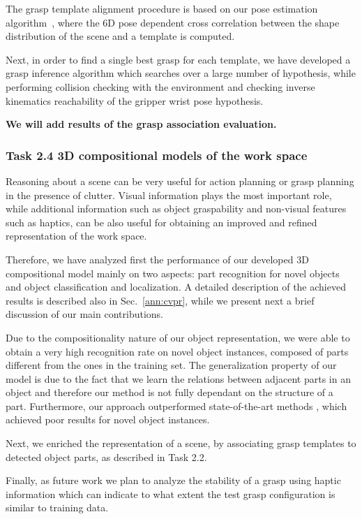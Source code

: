 \documentclass[a4paper,11pt,pdf]{pacmanreport}
\begin{document}
The grasp template alignment procedure is based on our pose estimation algorithm~\cite{detry2010ac}, where the 6D pose dependent cross correlation between the shape distribution of the scene and a template is computed. 

Next, in order to find a single best grasp for each template, we have developed a grasp inference algorithm which searches over a large number of hypothesis, while performing collision checking with the environment and checking inverse kinematics reachability of the gripper wrist pose hypothesis.

\textbf{We will add results of the grasp association evaluation.}

\subsubsection{Task 2.4 3D compositional models of the work space}

Reasoning about a scene can be very useful for action planning or grasp planning in the presence of clutter. Visual information plays the most important role, while additional information such as object graspability and non-visual features such as haptics, can be also useful for obtaining an improved and refined representation of the work space.

Therefore, we have analyzed first the performance of our developed 3D compositional model mainly on two aspects: part recognition for novel objects and object classification and localization. A detailed description of the achieved results is described also in Sec.~\ref{ann:cvpr}, while we present next a brief discussion of our main contributions.

Due to the compositionality nature of our object representation, we were able to obtain a very high recognition rate on novel object instances, composed of parts different from the ones in the training set. The generalization property of our model is due to the fact that we learn the relations between adjacent parts in an object and therefore our method is not fully dependant on the structure of a part. Furthermore, our approach outperformed state-of-the-art methods \cite{vfh}, which achieved poor results for novel object instances.

Next, we enriched the representation of a scene, by associating grasp templates to detected object parts, as described in Task 2.2.

Finally, as future work we plan to analyze the stability of a grasp using haptic information which can indicate to what extent the test grasp configuration is similar to training data.
\end{document}
